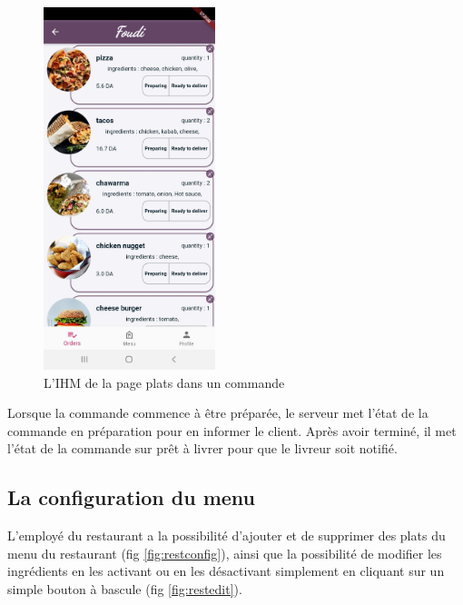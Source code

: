 \documentclass[french, a4paper, 12pt]{report}
\begin{document}
		\newpage
		\begin{figure}[h!]
			\center
			\includegraphics[width=5cm]{screenshots/Restaurantviews/ListofDishes.jpg}
			\caption{L'IHM de la page plats dans un commande}
			\label{fig:restdish}	
		\end{figure}
		Lorsque la commande commence à être préparée, le serveur met l'état de la commande en préparation pour en informer le client. Après avoir terminé, il met l'état de la commande sur prêt à livrer pour que le livreur soit notifié.
		
		\subsection{La configuration du menu} L'employé du restaurant a la possibilité d'ajouter et de supprimer des plats du menu du restaurant (fig \ref{fig:restconfig}), ainsi que la possibilité de modifier les ingrédients en les activant ou en les désactivant simplement en cliquant sur un simple bouton à bascule (fig \ref{fig:restedit}).
		
		\newpage
\end{document}
